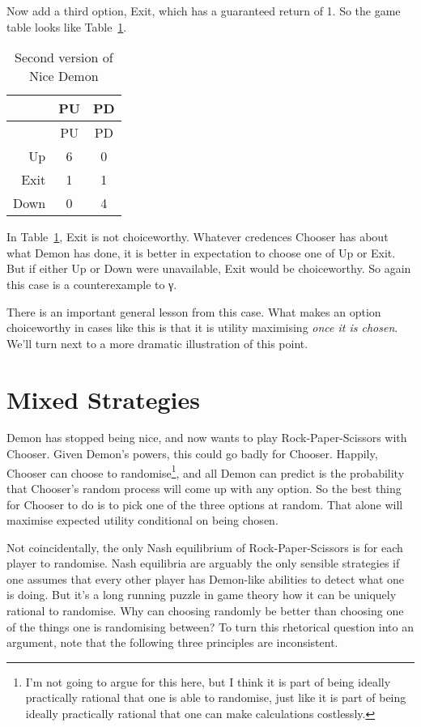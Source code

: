 \documentclass[
  11pt,
  letterpaper,
  DIV=11,
  numbers=noendperiod,
  twoside]{scrartcl}
\begin{document}
Now add a third option, Exit, which has a guaranteed return of 1. So the
game table looks like Table~\ref{tbl-nice-demon-exit}.

\begin{longtable}[]{@{}rcc@{}}
\caption{Second version of Nice
Demon}\label{tbl-nice-demon-exit}\tabularnewline
\toprule\noalign{}
& PU & PD \\
\midrule\noalign{}
\endfirsthead
\toprule\noalign{}
& PU & PD \\
\midrule\noalign{}
\endhead
\bottomrule\noalign{}
\endlastfoot
Up & 6 & 0 \\
Exit & 1 & 1 \\
Down & 0 & 4 \\
\end{longtable}

In Table~\ref{tbl-nice-demon-exit}, Exit is not choiceworthy. Whatever
credences Chooser has about what Demon has done, it is better in
expectation to choose one of Up or Exit. But if either Up or Down were
unavailable, Exit would be choiceworthy. So again this case is a
counterexample to γ.

There is an important general lesson from this case. What makes an
option choiceworthy in cases like this is that it is utility maximising
\emph{once it is chosen}. We'll turn next to a more dramatic
illustration of this point.

\section{Mixed Strategies}\label{sec-mixed}

Demon has stopped being nice, and now wants to play Rock-Paper-Scissors
with Chooser. Given Demon's powers, this could go badly for Chooser.
Happily, Chooser can choose to randomise\footnote{I'm not going to argue
  for this here, but I think it is part of being ideally practically
  rational that one is able to randomise, just like it is part of being
  ideally practically rational that one can make calculations
  costlessly.}, and all Demon can predict is the probability that
Chooser's random process will come up with any option. So the best thing
for Chooser to do is to pick one of the three options at random. That
alone will maximise expected utility conditional on being chosen.

Not coincidentally, the only Nash equilibrium of Rock-Paper-Scissors is
for each player to randomise. Nash equilibria are arguably the only
sensible strategies if one assumes that every other player has
Demon-like abilities to detect what one is doing. But it's a long
running puzzle in game theory how it can be uniquely rational to
randomise. Why can choosing randomly be better than choosing one of the
things one is randomising between? To turn this rhetorical question into
an argument, note that the following three principles are inconsistent.
\end{document}
